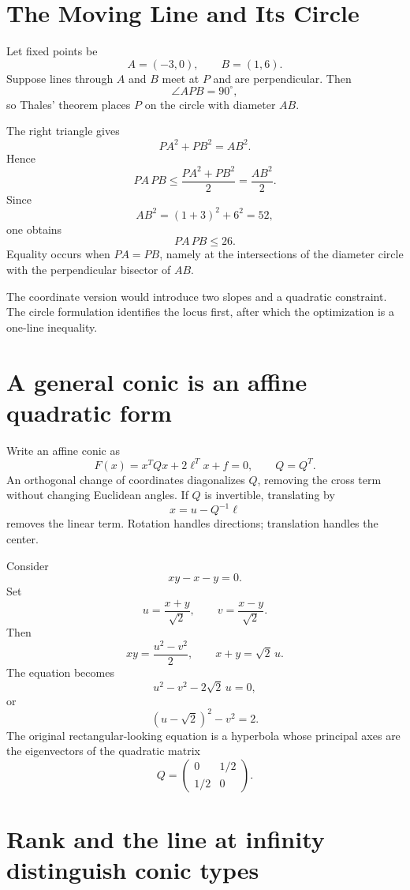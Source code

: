 \section{The Moving Line and Its Circle}

Let fixed points be
\[
  A=(-3,0),
  \qquad
  B=(1,6).
\]
Suppose lines through \(A\) and \(B\) meet at \(P\) and are perpendicular.  Then
\[
  \angle APB=90^\circ,
\]
so Thales' theorem places \(P\) on the circle with diameter \(AB\).

The right triangle gives
\[
  PA^2+PB^2=AB^2.
\]
Hence
\[
  PA\,PB
  \le\frac{PA^2+PB^2}{2}
  =\frac{AB^2}{2}.
\]
Since
\[
  AB^2=(1+3)^2+6^2=52,
\]
one obtains
\[
  \boxed{
  PA\,PB\le26.}
\]
Equality occurs when \(PA=PB\), namely at the intersections of the diameter circle with the perpendicular bisector of \(AB\).

The coordinate version would introduce two slopes and a quadratic constraint.  The circle formulation identifies the locus first, after which the optimization is a one-line inequality.

\section{A general conic is an affine quadratic form}

Write an affine conic as
\[
  F(x)=x^TQx+2\ell^Tx+f=0,
  \qquad Q=Q^T.
\]
An orthogonal change of coordinates diagonalizes \(Q\), removing the cross term without changing Euclidean angles.  If \(Q\) is invertible, translating by
\[
  x=u-Q^{-1}\ell
\]
removes the linear term.  Rotation handles directions; translation handles the center.

Consider
\[
  xy-x-y=0.
\]
Set
\[
  u=\frac{x+y}{\sqrt2},
  \qquad
  v=\frac{x-y}{\sqrt2}.
\]
Then
\[
  xy=\frac{u^2-v^2}{2},
  \qquad
  x+y=\sqrt2\,u.
\]
The equation becomes
\[
  u^2-v^2-2\sqrt2\,u=0,
\]
or
\[
  \boxed{
  (u-\sqrt2)^2-v^2=2.}
\]
The original rectangular-looking equation is a hyperbola whose principal axes are the eigenvectors of the quadratic matrix
\[
  Q=
  \begin{pmatrix}
    0&1/2\\
    1/2&0
  \end{pmatrix}.
\]

\section{Rank and the line at infinity distinguish conic types}

